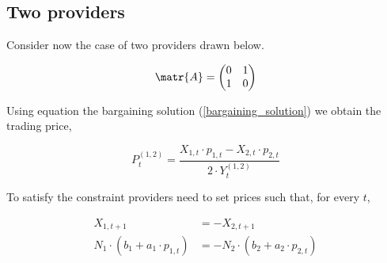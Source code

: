 \subsection{Two providers}

Consider now the case of two providers drawn below.

\vspace{5mm}
\begin{minipage}{.5\textwidth}
    \resizebox{\textwidth}{!}{}
\end{minipage}
\begin{minipage}{.45\textwidth}
    \begin{equation*}
        \matr{A} = \begin{pmatrix}
            0 & 1 \\
            1 & 0
        \end{pmatrix}
    \end{equation*}
\end{minipage}
\vspace{5mm}

Using equation the bargaining solution (\ref{bargaining_solution}) we obtain the trading price,

\begin{equation}
    P^{(1, 2)}_t = \frac{X_{1, t} \cdot p_{1, t} - X_{2, t} \cdot p_{2, t}}{2 \cdot Y^{(1, 2)}_t}
\end{equation}

To satisfy the constraint providers need to set prices such that, for every $t$,

\begin{equation}
    \begin{split}
        X_{1, t+1} &= - X_{2, t+1} \\
        N_1 \cdot \left( b_1 + a_1 \cdot p_{1, t} \right) &= - N_2 \cdot \left( b_2 + a_2 \cdot p_{2, t} \right)
    \end{split}
\end{equation}
